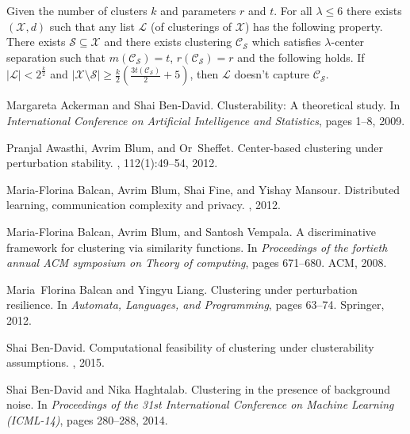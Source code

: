\documentclass[orivec]{llncs}
\newcommand{\mc}{\mathcal}
\begin{document}
\begin{theorem}
\label{thm:nosparselistlambdacs}
Given the number of clusters $k$ and parameters $r$ and $t$. For all $\lambda \le 6$ there exists $(\mc X, d)$ such that any list $\mc L$ (of clusterings of $\mc X$) has the following property. There exists $\mc S \subseteq \mc X$ and there exists clustering $\mc C_{\mc S}$ which satisfies $\lambda$-center separation such that $m(\mc C_{\mc S}) = t$, $r(\mc C_{\mc S}) = r$ and the following holds. If $|\mc L| < 2^{\frac{k}{2}}$ and $|\mc X \setminus \mc S|\ge \frac{k}{2}(\frac{3t(\mc C_{\mc S})}{2}+5)$, then $\mc L$ doesn't capture $\mc C_{\mc S}$.
\end{theorem}

\begin{thebibliography}{10}

Margareta Ackerman and Shai Ben-David.
\newblock Clusterability: A theoretical study.
\newblock In {\em International Conference on Artificial Intelligence and
  Statistics}, pages 1--8, 2009.

Pranjal Awasthi, Avrim Blum, and Or~Sheffet.
\newblock Center-based clustering under perturbation stability.
, 112(1):49--54, 2012.

Maria-Florina Balcan, Avrim Blum, Shai Fine, and Yishay Mansour.
\newblock Distributed learning, communication complexity and privacy.
, 2012.

Maria-Florina Balcan, Avrim Blum, and Santosh Vempala.
\newblock A discriminative framework for clustering via similarity functions.
\newblock In {\em Proceedings of the fortieth annual ACM symposium on Theory of
  computing}, pages 671--680. ACM, 2008.

Maria~Florina Balcan and Yingyu Liang.
\newblock Clustering under perturbation resilience.
\newblock In {\em Automata, Languages, and Programming}, pages 63--74.
  Springer, 2012.

Shai Ben-David.
\newblock Computational feasibility of clustering under clusterability
  assumptions.
, 2015.

Shai Ben-David and Nika Haghtalab.
\newblock Clustering in the presence of background noise.
\newblock In {\em Proceedings of the 31st International Conference on Machine
  Learning (ICML-14)}, pages 280--288, 2014.


\end{thebibliography}
\end{document}
